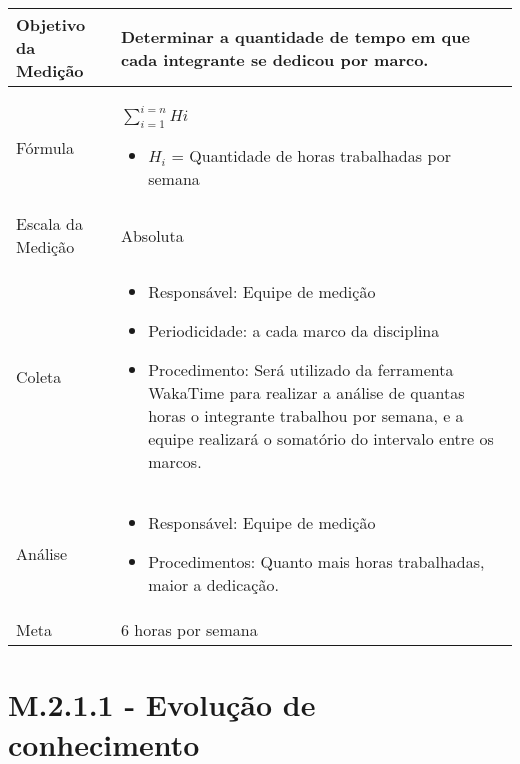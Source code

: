 	\begin{tabular}{ |p{4cm}|p{8cm}|  }
	 \hline
	 Objetivo da Medição 		& Determinar a quantidade de tempo em que cada integrante se dedicou por marco.	   \\ %
	 \hline
	 Fórmula		&  $\sum_{i=1}^{i=n}{Hi}$	\begin{itemize} \item $H_i$ = Quantidade de horas trabalhadas por semana \end{itemize}\\
	 \hline
	 Escala da Medição 		& Absoluta		 \\
	 \hline
	 Coleta		& 	\begin{itemize} \item Responsável: Equipe de medição \item Periodicidade: a cada marco da disciplina \item Procedimento: Será utilizado da ferramenta WakaTime para realizar a análise de quantas horas o integrante trabalhou por semana, e a equipe realizará o somatório do intervalo entre os marcos.\end{itemize}	\\
	 \hline
	 Análise		& 	\begin{itemize} \item Responsável: Equipe de medição \item Procedimentos: Quanto mais horas trabalhadas, maior a dedicação. \end{itemize}	 \\
	 \hline
	 Meta		& 	6 horas por semana	 \\
	 \hline
	\end{tabular}

	\section{M.2.1.1 - Evolução de conhecimento} %


